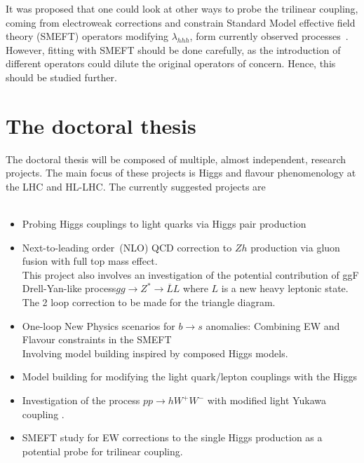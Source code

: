 \documentclass[12pt]{article}
\renewcommand{\bar}{\overline}
\begin{document}
\par It was proposed that one could look at other ways to probe the trilinear coupling, coming from electroweak corrections and constrain Standard Model effective field theory (SMEFT) operators modifying $\lambda_{hhh}$, form currently observed processes~\cite{Hartland:2019bjb}. However, fitting with SMEFT should be done carefully, as the introduction of different operators could dilute the original operators of concern. Hence, this should be studied further. 
 
 \section*{The doctoral thesis}
 The doctoral thesis will be composed of multiple, almost independent, research projects. The main focus of these projects is Higgs and flavour phenomenology at the LHC and HL-LHC. The currently suggested projects are\\ \bigskip\\
 \begin{minipage}{0.75\linewidth}
 \begin{itemize}
 	\item Probing Higgs couplings to light quarks via Higgs pair production
 	\item Next-to-leading order~(NLO) QCD correction to $Zh$ production via gluon fusion  with full top mass effect. \\ This project also involves an investigation of the potential contribution of ggF Drell-Yan-like process$ gg \to Z^* \to \bar L L$ where $L$ is a new heavy leptonic state. The  2 loop correction to be made for the triangle diagram.
 	\item One-loop New Physics scenarios for $b \to s$ anomalies: Combining EW and Flavour constraints in the SMEFT \\ Involving model building inspired by composed Higgs models. 
 	\item Model building for modifying the light quark/lepton couplings with the Higgs 
 	\item Investigation of the process $  pp \to h W^+ W^-$  with modified  light Yukawa coupling .
 	\item SMEFT study for EW corrections to the single Higgs production as a potential probe for trilinear coupling.
 \end{itemize}
 \end{minipage}
\end{document}
